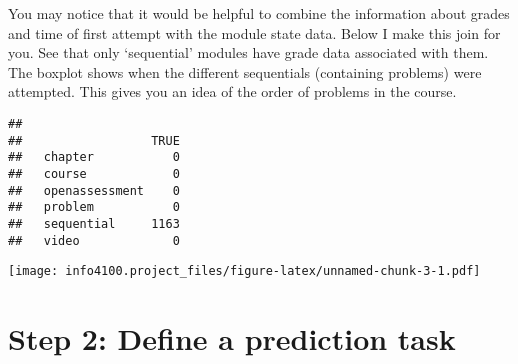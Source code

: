 \documentclass[
]{article}
\newenvironment{Shaded}{\begin{snugshade}}{\end{snugshade}}
\newcommand{\CommentTok}[1]{\textcolor[rgb]{0.56,0.35,0.01}{\textit{#1}}}
\newcommand{\DataTypeTok}[1]{\textcolor[rgb]{0.13,0.29,0.53}{#1}}
\newcommand{\DecValTok}[1]{\textcolor[rgb]{0.00,0.00,0.81}{#1}}
\newcommand{\KeywordTok}[1]{\textcolor[rgb]{0.13,0.29,0.53}{\textbf{#1}}}
\newcommand{\NormalTok}[1]{#1}
\newcommand{\OperatorTok}[1]{\textcolor[rgb]{0.81,0.36,0.00}{\textbf{#1}}}
\newcommand{\StringTok}[1]{\textcolor[rgb]{0.31,0.60,0.02}{#1}}
\begin{document}
You may notice that it would be helpful to combine the information about
grades and time of first attempt with the module state data. Below I
make this join for you. See that only `sequential' modules have grade
data associated with them. The boxplot shows when the different
sequentials (containing problems) were attempted. This gives you an idea
of the order of problems in the course.

\begin{Shaded}
\end{Shaded}

\begin{verbatim}
##                 
##                  TRUE
##   chapter           0
##   course            0
##   openassessment    0
##   problem           0
##   sequential     1163
##   video             0
\end{verbatim}

\begin{Shaded}
\end{Shaded}

\texttt{[image: info4100.project\_files/figure-latex/unnamed-chunk-3-1.pdf]}

\hypertarget{step-2-define-a-prediction-task}{%
\section{Step 2: Define a prediction
task}\label{step-2-define-a-prediction-task}}
\end{document}
